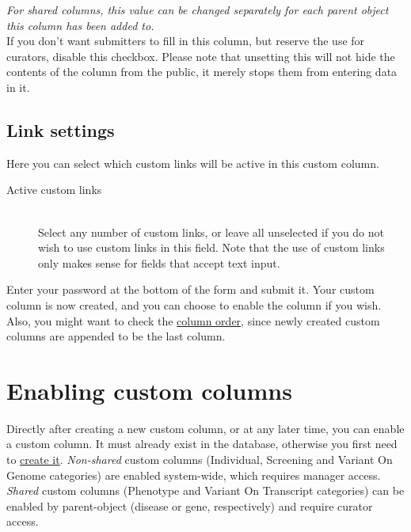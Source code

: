 \documentclass[a4paper,oneside,openany,12pt]{memoir}
\begin{document}
\begin{description}
  \emph{For shared columns, this value can be changed separately for each parent object this column has been added to.}
  \\
  If you don't want submitters to fill in this column, but reserve the use for curators, disable this checkbox.
  Please note that unsetting this will not hide the contents of the column from the public, it merely stops them from entering data in it.
\end{description}



\subsection{Link settings}
Here you can select which custom links will be active in this custom column.
\begin{description}
  \item[Active custom links] \hfill \\
  Select any number of custom links, or leave all unselected if you do not wish to use custom links in this field.
  Note that the use of custom links only makes sense for fields that accept text input.
\end{description}

\noindent
Enter your password at the bottom of the form and submit it.
Your custom column is now created, and you can choose to enable the column if you wish.
Also, you might want to check the \hyperlink{sec:columns_order}{column order}, since newly created custom columns are appended to be the last column.





\section{Enabling custom columns}
Directly after creating a new custom column, or at any later time, you can enable a custom column.
It must already exist in the database, otherwise you first need to \hyperlink{sec:custom_column_create}{create it}.
\emph{Non-shared} custom columns (Individual, Screening and Variant On Genome categories) are enabled system-wide, which requires manager access.
\emph{Shared} custom columns (Phenotype and Variant On Transcript categories) can be enabled by parent-object (disease or gene, respectively) and require curator access.
\end{document}
